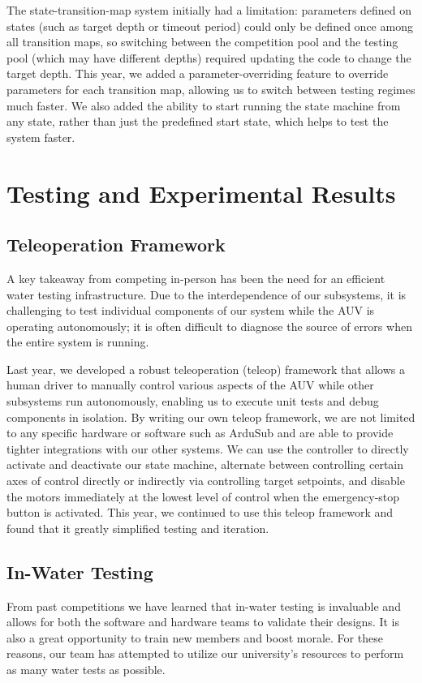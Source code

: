 \documentclass[conference]{IEEEtran}
\begin{document}
The state-transition-map system initially had a limitation: parameters defined on states (such as target depth or timeout period) could only be defined once among all transition maps, so switching between the competition pool and the testing pool (which may have different depths) required updating the code to change the target depth. This year, we added a parameter-overriding feature to override parameters for each transition map, allowing us to switch between testing regimes much faster. We also added the ability to start running the state machine from any state, rather than just the predefined start state, which helps to test the system faster.

\section{Testing and Experimental Results}
\label{sec:testing}

\subsection{Teleoperation Framework}
\label{ssec:teleop}
A key takeaway from competing in-person has been the need for an efficient water testing infrastructure. Due to the interdependence of our subsystems, it is challenging to test individual components of our system while the AUV is operating autonomously; it is often difficult to diagnose the source of errors when the entire system is running.

Last year, we developed a robust teleoperation (teleop) framework that allows a human driver to manually control various aspects of the AUV while other subsystems run autonomously, enabling us to execute unit tests and debug components in isolation. By writing our own teleop framework, we are not limited to any specific hardware or software such as ArduSub and are able to provide tighter integrations with our other systems. We can use the controller to directly activate and deactivate our state machine, alternate between controlling certain axes of control directly or indirectly via controlling target setpoints, and disable the motors immediately at the lowest level of control when the emergency-stop button is activated. This year, we continued to use this teleop framework and found that it greatly simplified testing and iteration.

\subsection{In-Water Testing}
\label{ssec:in_water_testing}
From past competitions we have learned that in-water testing is invaluable and allows for both the software and hardware teams to validate their designs. It is also a great opportunity to train new members and boost morale. For these reasons, our team has attempted to utilize our university's resources to perform as many water tests as possible.
\end{document}
